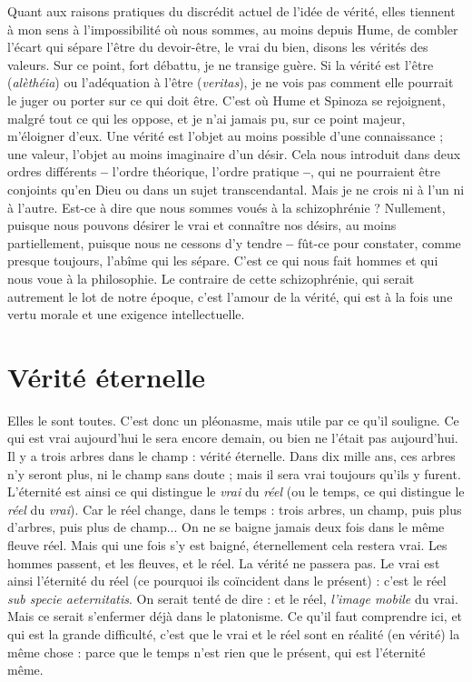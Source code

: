 Quant aux raisons pratiques du discrédit actuel de l’idée de vérité, elles
tiennent à mon sens à l'impossibilité où nous sommes, au moins depuis Hume,
de combler l'écart qui sépare l’être du devoir-être, le vrai du bien, disons les
vérités des valeurs. Sur ce point, fort débattu, je ne transige guère. Si la vérité
est l’être ({\it alèthéia}) ou l'adéquation à l’être ({\it veritas}), je ne vois pas comment elle
pourrait le juger ou porter sur ce qui doit être. C’est où Hume et Spinoza se
rejoignent, malgré tout ce qui les oppose, et je n’ai jamais pu, sur ce point
majeur, m’éloigner d’eux. Une vérité est l’objet au moins possible d’une
connaissance ; une valeur, l’objet au moins imaginaire d’un désir. Cela nous
introduit dans deux ordres différents {\bf --} l’ordre théorique, l’ordre pratique {\bf --}, qui
ne pourraient être conjoints qu’en Dieu ou dans un sujet transcendantal. Mais
je ne crois ni à l’un ni à l’autre. Est-ce à dire que nous sommes voués à la
schizophrénie ? Nullement, puisque nous pouvons désirer le vrai et connaître
nos désirs, au moins partiellement, puisque nous ne cessons d’y tendre {\bf --} fût-ce
pour constater, comme presque toujours, l’abîme qui les sépare. C’est ce qui
nous fait hommes et qui nous voue à la philosophie. Le contraire de cette schizophrénie,
qui serait autrement le lot de notre époque, c’est l'amour de la
vérité, qui est à la fois une vertu morale et une exigence intellectuelle.

\section{Vérité éternelle}
Elles le sont toutes. C’est donc un pléonasme, mais
utile par ce qu’il souligne. Ce qui est vrai aujourd’hui
le sera encore demain, ou bien ne l'était pas aujourd’hui. Il y a trois arbres
dans le champ : vérité éternelle. Dans dix mille ans, ces arbres n’y seront plus,
ni le champ sans doute ; mais il sera vrai toujours qu’ils y furent. L’éternité est
ainsi ce qui distingue le {\it vrai} du {\it réel} (ou le temps, ce qui distingue le {\it réel} du
{\it vrai}). Car le réel change, dans le temps : trois arbres, un champ, puis plus
d'arbres, puis plus de champ... On ne se baigne jamais deux fois dans le même
fleuve réel. Mais qui une fois s’y est baigné, éternellement cela restera vrai. Les
hommes passent, et les fleuves, et le réel. La vérité ne passera pas. Le vrai est
ainsi l'éternité du réel (ce pourquoi ils coïncident dans le présent) : c’est le réel
{\it sub specie aeternitatis}. On serait tenté de dire : et le réel, {\it l'image mobile} du vrai.
Mais ce serait s’enfermer déjà dans le platonisme. Ce qu’il faut comprendre ici,
et qui est la grande difficulté, c’est que le vrai et le réel sont en réalité (en vérité)
la même chose : parce que le temps n’est rien que le présent, qui est l'éternité
même.

